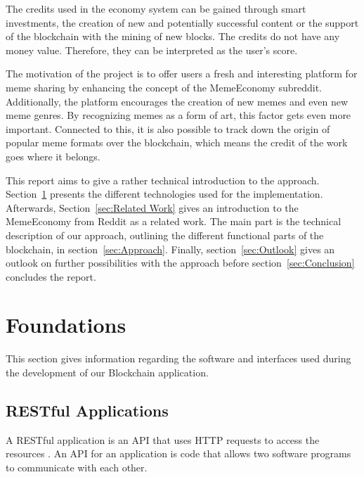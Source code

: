 \documentclass[12pt]{article}
\begin{document}
    The credits used in the economy system can be gained through smart investments, the creation of new and potentially successful content or the support of the blockchain with the mining of new blocks. The credits do not have any money value. Therefore, they can be interpreted as the user's score.
    
    The motivation of the project is to offer users a fresh and interesting platform for meme sharing by enhancing the concept of the MemeEconomy subreddit. Additionally, the platform encourages the creation of new memes and even new meme genres. By recognizing memes as a form of art, this factor gets even more important. Connected to this, it is also possible to track down the origin of popular meme formats over the blockchain, which means the credit of the work goes where it belongs.

    This report aims to give a rather technical introduction to the approach. Section~\ref{sec:Foundations} presents the different technologies used for the implementation. Afterwards, Section~\ref{sec:Related Work} gives an introduction to the MemeEconomy from Reddit as a related work. The main part is the technical description of our approach, outlining the different functional parts of the blockchain, in section~\ref{sec:Approach}. Finally, section~\ref{sec:Outlook} gives an outlook on further possibilities with the approach before section~\ref{sec:Conclusion} concludes the report.


\section{Foundations} \label{sec:Foundations} %
This section gives information regarding the software and interfaces used during the development of our Blockchain application.

\subsection{RESTful Applications}

A RESTful application is an \ac{API} that uses HTTP requests to access the resources \cite{Restful}. An API for an application is code that allows two software programs to communicate with each other.
\end{document}
